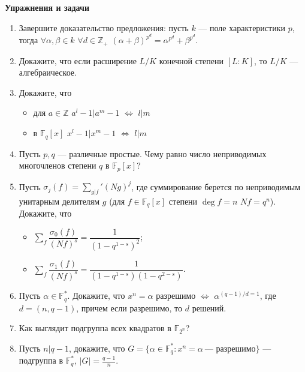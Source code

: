 \noindent\textbf{Упражнения и задачи}

\begin{enumerate}[topsep=0pt]
    \item Завершите доказательство предложения: пусть $k$ --- поле характеристики $p$, тогда $\forall \alpha, \beta \in k$ $\forall d \in \mathbb{Z}_+$ $(\alpha+\beta)^{p^d}=\alpha^{p^d}+\beta^{p^d}$.
    \item Докажите, что если расширение $L/K$ конечной степени $[L:K]$, то $L/K$ --- алгебраическое.
    \item Докажите, что
    \begin{itemize}[noitemsep,topsep=0pt]
        \item для $a\in\mathbb{Z}$ $a^l-1|a^m-1$ $\Leftrightarrow$ $l|m$
        \item в $\mathbb{F}_q[x]$ $x^l-1|x^m-1$ $\Leftrightarrow$ $l|m$
    \end{itemize}

    \item Пусть $p,q$ --- различные простые. Чему равно число неприводимых многочленов степени $q$ в $\mathbb{F}_p[x]$? %
    
    \item Пусть $\sigma_j(f) = \sum_{g|f}' (Ng)^j$, где суммирование берется по неприводимым унитарным делителям $g$ (для $f\in\mathbb{F}_q[x]$ степени $\deg f = n$ $Nf=q^n$). Докажите, что
    \begin{itemize}[noitemsep,topsep=0pt]
        \item $\sum\limits_f \dfrac{\sigma_0(f)}{(Nf)^s} = \dfrac{1}{(1-q^{1-s})^2}$;
        \item $\sum\limits_f \dfrac{\sigma_1(f)}{(Nf)^s} = \dfrac{1}{(1-q^{1-s})(1-q^{2-s})}$.
    \end{itemize} %

    \item Пусть $\alpha \in \mathbb{F}_q^*$. Докажите, что $x^n=\alpha$ разрешимо $\Leftrightarrow$ $\alpha^{(q-1)/d=1}$, где $d=(n,q-1)$, причем если разрешимо, то $d$ решений. %

    \item Как выглядит подгруппа всех квадратов в $\mathbb{F}_{2^n}$? %

    \item Пусть $n|q-1$, докажите, что $G=\{\alpha\in\mathbb{F}_q^*: x^n=\alpha\ \text{--- разрешимо}\}$ --- подгруппа в $\mathbb{F}_q^*$, $|G|=\frac{q-1}{n}$. %


\end{enumerate}
